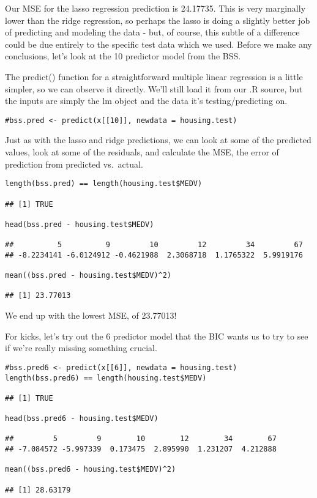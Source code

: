 \documentclass[]{article}
\begin{document}
Our MSE for the lasso regression prediction is 24.17735. This is very
marginally lower than the ridge regression, so perhaps the lasso is
doing a slightly better job of predicting and modeling the data - but,
of course, this subtle of a difference could be due entirely to the
specific test data which we used. Before we make any conclusions, let's
look at the 10 predictor model from the BSS.

The predict() function for a straightforward multiple linear regression
is a little simpler, so we can observe it directly. We'll still load it
from our .R source, but the inputs are simply the lm object and the data
it's testing/predicting on.

\begin{verbatim}
#bss.pred <- predict(x[[10]], newdata = housing.test)
\end{verbatim}

Just as with the lasso and ridge predictions, we can look at some of the
predicted values, look at some of the residuals, and calculate the MSE,
the error of prediction from predicted vs.~actual.

\begin{verbatim}
length(bss.pred) == length(housing.test$MEDV)

## [1] TRUE

head(bss.pred - housing.test$MEDV)

##          5          9         10         12         34         67 
## -8.2234141 -6.0124912 -0.4621988  2.3068718  1.1765322  5.9919176

mean((bss.pred - housing.test$MEDV)^2)

## [1] 23.77013
\end{verbatim}

We end up with the lowest MSE, of 23.77013!

For kicks, let's try out the 6 predictor model that the BIC wants us to
try to see if we're really missing something crucial.

\begin{verbatim}
#bss.pred6 <- predict(x[[6]], newdata = housing.test)
length(bss.pred6) == length(housing.test$MEDV)

## [1] TRUE

head(bss.pred6 - housing.test$MEDV)

##         5         9        10        12        34        67 
## -7.084572 -5.997339  0.173475  2.895990  1.231207  4.212888

mean((bss.pred6 - housing.test$MEDV)^2)

## [1] 28.63179
\end{verbatim}
\end{document}
